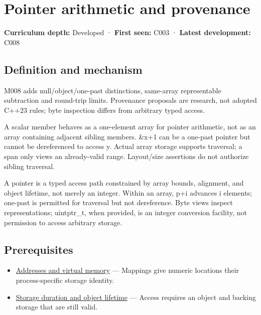 \hypertarget{appendix-6af5921bc853}{}\label{referencestart:appendix-6af5921bc853}
\section{Pointer arithmetic and provenance}\label{appendix-6af5921bc853-pointer-arithmetic-and-provenance}

\textbf{Curriculum depth:} Developed · \textbf{First seen:} C003 · \textbf{Latest development:} C008

\begin{allmightroledefinition}

\subsection{Definition and mechanism}\label{appendix-6af5921bc853-definition-and-mechanism}

M008 adds null/object/one-past distinctions, same-array representable subtraction and round-trip limits. Provenance proposals are research, not adopted C++23 rules; byte inspection differs from arbitrary typed access.

\end{allmightroledefinition}

A scalar member behaves as a one-element array for pointer arithmetic, not as an array containing adjacent sibling members. \&x+1 can be a one-past pointer but cannot be dereferenced to access y. Actual array storage supports traversal; a span only views an already-valid range. Layout/size assertions do not authorize sibling traversal.

A pointer is a typed access path constrained by array bounds, alignment, and object lifetime, not merely an integer. Within an array, p+i advances i elements; one-past is permitted for traversal but not dereference. Byte views inspect representations; uintptr\_t, when provided, is an integer conversion facility, not permission to access arbitrary storage.

\subsection{Prerequisites}\label{appendix-6af5921bc853-prerequisites}

\begin{itemize}
\tightlist
\item
  \hyperref[appendix-18ee4f913c3c]{Addresses and virtual memory} --- Mappings give numeric locations their process-specific storage identity.
\item
  \hyperref[appendix-0b104bcba06b]{Storage duration and object lifetime} --- Access requires an object and backing storage that are still valid.
\end{itemize}

